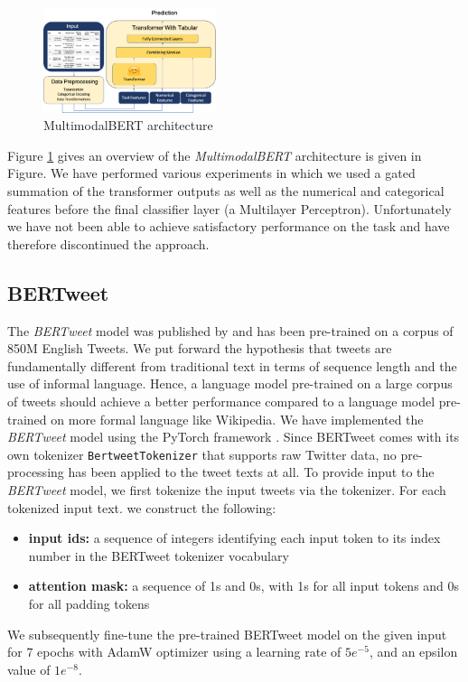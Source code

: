 \documentclass[11pt,a4paper]{article}
\begin{document}
\begin{figure}[h]
\centering
\includegraphics[width=0.45\textwidth]{images/multimodal_bert}
\caption{MultimodalBERT architecture}
\label{fig:multimodal_bert_architecture}
\end{figure}
\newline
Figure \ref{fig:multimodal_bert_architecture} gives an overview of the \textit{MultimodalBERT} architecture is given in Figure. We have performed various experiments in which we used a gated summation of the transformer outputs as well as the numerical and categorical features before the final classifier layer (a Multilayer Perceptron). Unfortunately we have not been able to achieve satisfactory performance on the task and have therefore discontinued the approach.

\subsection{BERTweet}
The \textit{BERTweet} model was published by \citet{RN683} and has been pre-trained on a corpus of 850M English Tweets. We put forward the hypothesis that tweets are fundamentally different from traditional text in terms of sequence length and the use of informal language. Hence, a language model pre-trained on a large corpus of tweets should achieve a better performance compared to a language model pre-trained on more formal language like Wikipedia.
\newline
We have implemented the \textit{BERTweet} model using the PyTorch framework \citep{RN684}. Since BERTweet comes with its own tokenizer \verb|BertweetTokenizer| that supports raw Twitter data, no pre-processing has been applied to the tweet texts at all.
To provide input to the \textit{BERTweet} model, we first tokenize the input tweets via the tokenizer. For each tokenized input text.  we construct the following:
\begin{itemize}[noitemsep,topsep=2pt,parsep=0pt,partopsep=0pt]
    \item \textbf{input ids:} a sequence of integers identifying each input token to its index number in the BERTweet tokenizer vocabulary
    \item \textbf{attention mask:} a sequence of 1s and 0s, with 1s for all input tokens and 0s for all padding tokens
\end{itemize}
We subsequently fine-tune the pre-trained BERTweet model on the given input for $7$ epochs with AdamW optimizer \citep{RN687} using a learning rate of $5e^{-5}$, and an epsilon value of $1e^{-8}$.
\end{document}

